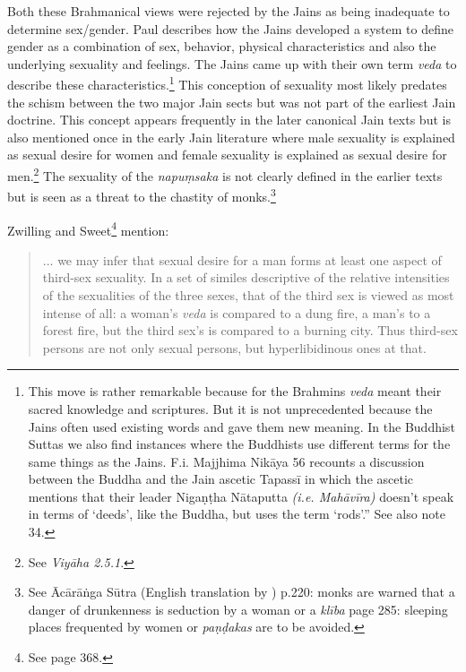 Both these Brahmanical views were rejected by the Jains as being inadequate to determine sex/gender. Paul \cite{dundas} describes how the Jains developed a system to define gender as a combination of sex, behavior, physical characteristics and also the underlying sexuality and feelings. The Jains came up with their own term {\em veda} to describe these characteristics.\footnote{This move is rather remarkable because for the Brahmins {\em veda} meant their sacred knowledge and scriptures. But it is not unprecedented because the Jains often used existing words and gave them new meaning. In the Buddhist Suttas we also find instances where the Buddhists use different terms for the same things as the Jains. F.i. Majjhima Nikāya 56 recounts a discussion between the Buddha and the Jain ascetic Tapassī in which the ascetic mentions that their leader Nigaṇṭha Nātaputta {\em (i.e. Mahāvīra)} doesn’t speak in terms of ‘deeds’, like the Buddha, but uses the term ‘rods’.” See also \cite{zwilling} note 34.} This conception of sexuality most likely predates the schism between the two major Jain sects but was not part of the earliest Jain doctrine. This concept appears frequently in the later canonical Jain texts but is also mentioned once in the early Jain literature where male sexuality is explained as sexual desire for women and female sexuality is explained as sexual desire for men.\footnote{See {\em Viyāha 2.5.1}.} The sexuality of the {\em napuṃsaka} is not clearly defined in the earlier texts but is seen as a threat to the chastity of monks.\footnote{See Ācārāṅga Sūtra (English translation by \cite{jacobi}) p.220: monks are warned that a danger of drunkenness is seduction by a woman or a {\em klība} page 285: sleeping places frequented by women or {\em paṇḍakas} are to be avoided.}

Zwilling and Sweet\footnote{See \cite{zwilling} page 368.} mention:

\begin{quote}
... we may infer that sexual desire for a man forms at least one aspect of third-sex sexuality. In a set of similes descriptive of the relative intensities of the sexualities of the three sexes, that of the third sex is viewed as most intense of all: a woman's {\em veda} is compared to a dung fire, a man's to a forest fire, but the third sex's is compared to a burning city. Thus third-sex persons are not only sexual persons, but hyperlibidinous ones at that.
\end{quote}

